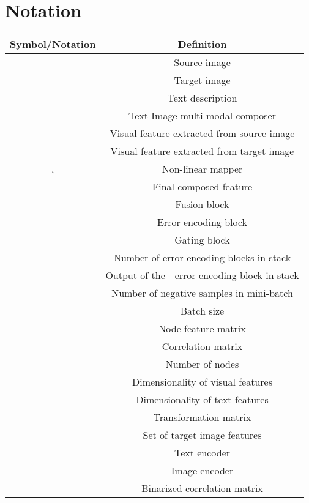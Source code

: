 \documentclass[10pt,twocolumn,letterpaper]{article}
\begin{document}
{\small


}

\newpage
\appendix

\section{Notation}
\begin{table}[H]
    \centering
    \begin{adjustbox}{width=0.45\textwidth}
    \begin{tabular}{cc}
        \toprule
        Symbol/Notation & Definition \\ 
        \hline \hline
         & Source image \\ 
         & Target image \\
         & Text description \\
         & Text-Image multi-modal composer \\
         & Visual feature extracted from source image \\
         & Visual feature extracted from target image \\
        ,  & Non-linear mapper \\
         & Final composed feature \\
         & Fusion block \\
         & Error encoding block \\
         & Gating block \\
         & Number of error encoding blocks in stack \\
         & Output of the - error encoding block in stack \\
         & Number of negative samples in mini-batch \\
         & Batch size \\
         & Node feature matrix \\
         & Correlation matrix \\
         & Number of nodes \\
         & Dimensionality of visual features \\
         & Dimensionality of text features \\
         & Transformation matrix \\
         & Set of target image features \\
         & Text encoder \\
         & Image encoder \\
         & Binarized correlation matrix \\

\end{tabular}
\end{adjustbox}
\end{table}
\end{document}
